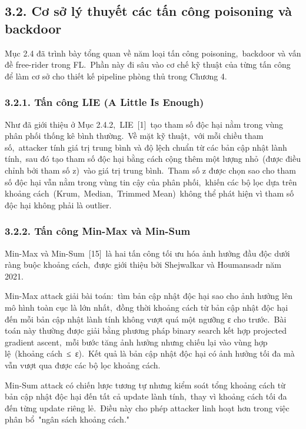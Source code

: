 \subsection{3.2. Cơ sở lý thuyết các tấn công poisoning và backdoor}\label{cux1a1-sux1edf-luxfd-thuyux1ebft-cuxe1c-tux1ea5n-cuxf4ng-poisoning-vuxe0-backdoor}

Mục 2.4 đã trình bày tổng quan về năm loại tấn công poisoning,~backdoor và vấn đề free-rider trong FL.~Phần này đi sâu vào cơ chế kỹ thuật của từng tấn công để làm cơ sở cho thiết kế pipeline phòng thủ trong Chương 4.

\subsubsection{3.2.1. Tấn công LIE (A Little Is Enough)}\label{tux1ea5n-cuxf4ng-lie-a-little-is-enough}

Như đã giới thiệu ở Mục 2.4.2,~LIE~{[}1{]}~tạo tham số độc hại nằm trong vùng phân phối thống kê bình thường.~Về mặt kỹ thuật,~với mỗi chiều tham số,~attacker tính giá trị trung bình và độ lệch chuẩn từ các bản cập nhật lành tính,~sau đó tạo tham số độc hại bằng cách cộng thêm một lượng nhỏ~(được điều chỉnh bởi tham số z)~vào giá trị trung bình.~Tham số z được chọn sao cho tham số độc hại vẫn nằm trong vùng tin cậy của phân phối,~khiến các bộ lọc dựa trên khoảng cách~(Krum,~Median,~Trimmed Mean)~không thể phát hiện vì tham số độc hại không phải là outlier.

\subsubsection{3.2.2. Tấn công Min-Max và Min-Sum}\label{tux1ea5n-cuxf4ng-min-max-vuxe0-min-sum}

Min-Max và Min-Sum~{[}15{]}~là hai tấn công tối ưu hóa ảnh hưởng đầu độc dưới ràng buộc khoảng cách,~được giới thiệu bởi Shejwalkar và Houmansadr năm 2021.

Min-Max attack giải bài toán:~tìm bản cập nhật độc hại sao cho ảnh hưởng lên mô hình toàn cục là lớn nhất,~đồng thời khoảng cách từ bản cập nhật độc hại đến mỗi bản cập nhật lành tính không vượt quá một ngưỡng ε cho trước.~Bài toán này thường được giải bằng phương pháp binary search kết hợp projected gradient ascent,~mỗi bước tăng ảnh hưởng nhưng chiếu lại vào vùng hợp lệ~(khoảng cách~≤~ε).~Kết quả là bản cập nhật độc hại có ảnh hưởng tối đa mà vẫn vượt qua được các bộ lọc khoảng cách.

Min-Sum attack có chiến lược tương tự nhưng kiểm soát tổng khoảng cách từ bản cập nhật độc hại đến tất cả update lành tính,~thay vì khoảng cách tối đa đến từng update riêng lẻ.~Điều này cho phép attacker linh hoạt hơn trong việc phân bổ~"ngân sách khoảng cách."

